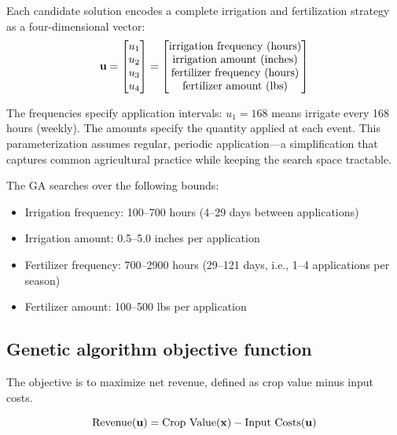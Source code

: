 \documentclass[preprint,12pt]{elsarticle}
\begin{document}
Each candidate solution encodes a complete irrigation and fertilization strategy as a four-dimensional vector:
\begin{equation}
{\bf u} = \begin{bmatrix} u_{1} \\ u_{2} \\ u_{3} \\ u_{4} \end{bmatrix} = \begin{bmatrix} \text{irrigation frequency (hours)} \\ \text{irrigation amount (inches)} \\ \text{fertilizer frequency (hours)} \\ \text{fertilizer amount (lbs)} \end{bmatrix}
\label{eqn:design-vars}
\end{equation}

The frequencies specify application intervals: $u_{1} = 168$ means irrigate every 168 hours (weekly). The amounts specify the quantity applied at each event. This parameterization assumes regular, periodic application---a simplification that captures common agricultural practice while keeping the search space tractable.

The GA searches over the following bounds:
\begin{itemize}
\item Irrigation frequency: 100--700 hours (4--29 days between applications)
\item Irrigation amount: 0.5--5.0 inches per application
\item Fertilizer frequency: 700--2900 hours (29--121 days, i.e., 1--4 applications per season)
\item Fertilizer amount: 100--500 lbs per application
\end{itemize}

\subsection{Genetic algorithm objective function}\label{subsec:objective}

The objective is to maximize net revenue, defined as crop value minus input costs.

\begin{equation}
\text{Revenue}({\bf u}) = \text{Crop Value}({\bf x}) - \text{Input Costs}({\bf u})
\label{eqn:cost-function}
\end{equation}
\end{document}
